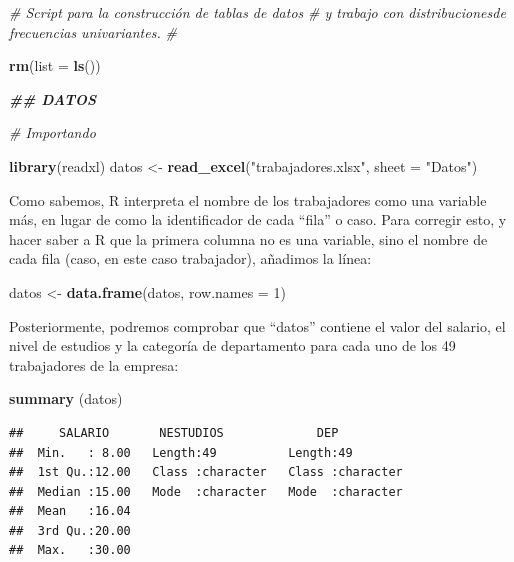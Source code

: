 \documentclass[
]{book}
\newenvironment{Shaded}{\begin{snugshade}}{\end{snugshade}}
\newcommand{\AttributeTok}[1]{\textcolor[rgb]{0.13,0.29,0.53}{#1}}
\newcommand{\CommentTok}[1]{\textcolor[rgb]{0.56,0.35,0.01}{\textit{#1}}}
\newcommand{\DecValTok}[1]{\textcolor[rgb]{0.00,0.00,0.81}{#1}}
\newcommand{\DocumentationTok}[1]{\textcolor[rgb]{0.56,0.35,0.01}{\textbf{\textit{#1}}}}
\newcommand{\FunctionTok}[1]{\textcolor[rgb]{0.13,0.29,0.53}{\textbf{#1}}}
\newcommand{\NormalTok}[1]{#1}
\newcommand{\OtherTok}[1]{\textcolor[rgb]{0.56,0.35,0.01}{#1}}
\newcommand{\StringTok}[1]{\textcolor[rgb]{0.31,0.60,0.02}{#1}}
\begin{document}
\begin{Shaded}
\begin{Highlighting}[]
\CommentTok{\# Script para la construcción de tablas de datos }
\CommentTok{\# y trabajo con distribucionesde frecuencias univariantes.}
\CommentTok{\#}

\FunctionTok{rm}\NormalTok{(}\AttributeTok{list =} \FunctionTok{ls}\NormalTok{())}

\DocumentationTok{\#\# DATOS}

\CommentTok{\# Importando}

\FunctionTok{library}\NormalTok{(readxl)}
\NormalTok{datos }\OtherTok{\textless{}{-}} \FunctionTok{read\_excel}\NormalTok{(}\StringTok{"trabajadores.xlsx"}\NormalTok{, }\AttributeTok{sheet =} \StringTok{"Datos"}\NormalTok{)}
\end{Highlighting}
\end{Shaded}

Como sabemos, R interpreta el nombre de los trabajadores como una variable más, en lugar de como la identificador de cada ``fila'' o caso.
Para corregir esto, y hacer saber a R que la primera columna no es una variable, sino el nombre de cada fila (caso, en este caso trabajador), añadimos la línea:

\begin{Shaded}
\begin{Highlighting}[]
\NormalTok{datos }\OtherTok{\textless{}{-}} \FunctionTok{data.frame}\NormalTok{(datos, }\AttributeTok{row.names =} \DecValTok{1}\NormalTok{)}
\end{Highlighting}
\end{Shaded}

Posteriormente, podremos comprobar que ``datos'' contiene el valor del salario, el nivel de estudios y la categoría de departamento para cada uno de los 49 trabajadores de la empresa:

\begin{Shaded}
\begin{Highlighting}[]
\FunctionTok{summary}\NormalTok{ (datos)}
\end{Highlighting}
\end{Shaded}

\begin{verbatim}
##     SALARIO       NESTUDIOS             DEP           
##  Min.   : 8.00   Length:49          Length:49         
##  1st Qu.:12.00   Class :character   Class :character  
##  Median :15.00   Mode  :character   Mode  :character  
##  Mean   :16.04                                        
##  3rd Qu.:20.00                                        
##  Max.   :30.00
\end{verbatim}
\end{document}
